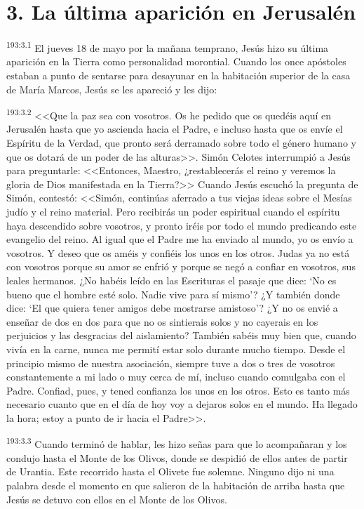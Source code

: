 \section*{3. La última aparición en Jerusalén}
\par 
\textsuperscript{193:3.1} El jueves 18 de mayo por la mañana temprano, Jesús hizo su última aparición en la Tierra como personalidad morontial. Cuando los once apóstoles estaban a punto de sentarse para desayunar en la habitación superior de la casa de María Marcos, Jesús se les apareció y les dijo:

\par 
\textsuperscript{193:3.2} <<Que la paz sea con vosotros. Os he pedido que os quedéis aquí en Jerusalén hasta que yo ascienda hacia el Padre, e incluso hasta que os envíe el Espíritu de la Verdad, que pronto será derramado sobre todo el género humano y que os dotará de un poder de las alturas>>. Simón Celotes interrumpió a Jesús para preguntarle: <<Entonces, Maestro, ¿restablecerás el reino y veremos la gloria de Dios manifestada en la Tierra?>> Cuando Jesús escuchó la pregunta de Simón, contestó: <<Simón, continúas aferrado a tus viejas ideas sobre el Mesías judío y el reino material. Pero recibirás un poder espiritual cuando el espíritu haya descendido sobre vosotros, y pronto iréis por todo el mundo predicando este evangelio del reino. Al igual que el Padre me ha enviado al mundo, yo os envío a vosotros. Y deseo que os améis y confiéis los unos en los otros. Judas ya no está con vosotros porque su amor se enfrió y porque se negó a confiar en vosotros, sus leales hermanos. ¿No habéis leído en las Escrituras el pasaje que dice: `No es bueno que el hombre esté solo. Nadie vive para sí mismo'? ¿Y también donde dice: `El que quiera tener amigos debe mostrarse amistoso'? ¿Y no os envié a enseñar de dos en dos para que no os sintierais solos y no cayerais en los perjuicios y las desgracias del aislamiento? También sabéis muy bien que, cuando vivía en la carne, nunca me permití estar solo durante mucho tiempo. Desde el principio mismo de nuestra asociación, siempre tuve a dos o tres de vosotros constantemente a mi lado o muy cerca de mí, incluso cuando comulgaba con el Padre. Confiad, pues, y tened confianza los unos en los otros. Esto es tanto más necesario cuanto que en el día de hoy voy a dejaros solos en el mundo. Ha llegado la hora; estoy a punto de ir hacia el Padre>>.

\par 
\textsuperscript{193:3.3} Cuando terminó de hablar, les hizo señas para que lo acompañaran y los condujo hasta el Monte de los Olivos, donde se despidió de ellos antes de partir de Urantia. Este recorrido hasta el Olivete fue solemne. Ninguno dijo ni una palabra desde el momento en que salieron de la habitación de arriba hasta que Jesús se detuvo con ellos en el Monte de los Olivos.

